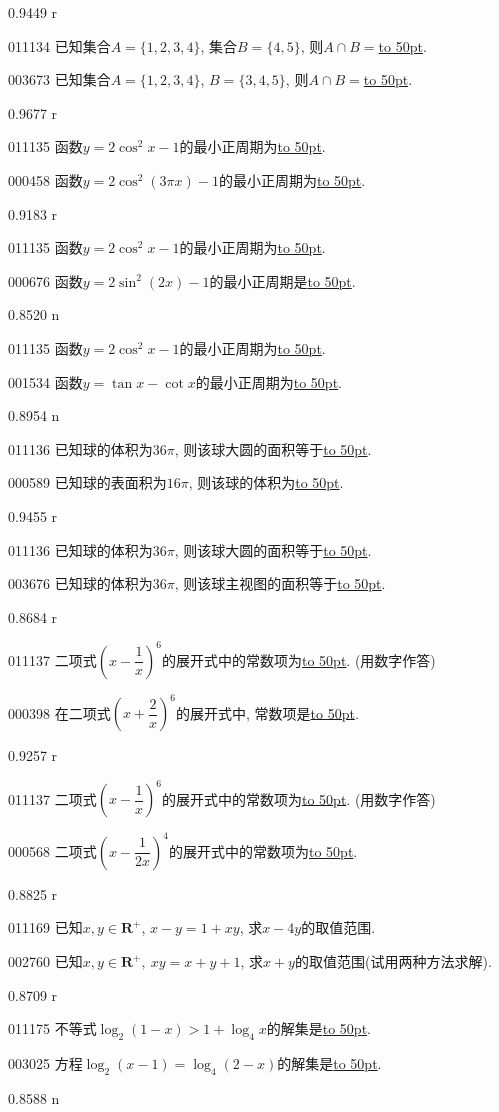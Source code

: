 \documentclass[10pt,a4paper]{article}
\newcommand{\blank}[1]{\underline{\hbox to #1pt{}}}
\begin{document}
0.9449 r

011134	已知集合$A=\{1,2,3,4\}$, 集合$B=\{4,5\}$, 则$A\cap B=$\blank{50}.

003673	已知集合$A=\{1,2,3,4\}$, $B=\{3,4,5\}$, 则$A\cap B=$\blank{50}.

0.9677 r

011135	函数$y=2\cos ^2x-1$的最小正周期为\blank{50}.

000458	函数$y=2\cos^2(3\pi x)-1$的最小正周期为\blank{50}.

0.9183 r

011135	函数$y=2\cos ^2x-1$的最小正周期为\blank{50}.

000676	函数$y=2\sin^2(2x)-1$的最小正周期是\blank{50}.

0.8520 n

011135	函数$y=2\cos ^2x-1$的最小正周期为\blank{50}.

001534	函数$y=\tan x-\cot x$的最小正周期为\blank{50}.

0.8954 n

011136	已知球的体积为$36\pi$, 则该球大圆的面积等于\blank{50}.

000589	已知球的表面积为$16\pi$, 则该球的体积为\blank{50}.

0.9455 r

011136	已知球的体积为$36\pi$, 则该球大圆的面积等于\blank{50}.

003676	已知球的体积为$36\pi$, 则该球主视图的面积等于\blank{50}.

0.8684 r

011137	二项式$(x-\dfrac 1x)^6$的展开式中的常数项为\blank{50}. (用数字作答)

000398	在二项式$(x+\dfrac2x)^6$的展开式中, 常数项是\blank{50}.

0.9257 r

011137	二项式$(x-\dfrac 1x)^6$的展开式中的常数项为\blank{50}. (用数字作答)

000568	二项式$(x-\dfrac1{2x})^4$的展开式中的常数项为\blank{50}.

0.8825 r

011169	已知$x,y\in \mathbf{R}^+$, $x-y=1+xy$, 求$x-4y$的取值范围.

002760	已知$x,y\in \mathbf{R}^+, \ xy=x+y+1$, 求$x+y$的取值范围(试用两种方法求解).

0.8709 r

011175	不等式$\log_2(1-x)>1+\log_4x$的解集是\blank{50}.

003025	方程$\log_2(x-1)=\log_4(2-x)$的解集是\blank{50}.

0.8588 n
\end{document}
